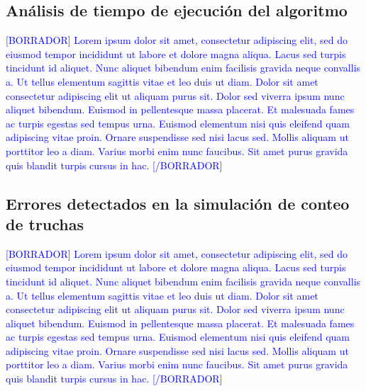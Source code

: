 \subsection{Análisis de tiempo de ejecución del algoritmo}

\textcolor{blue}{[BORRADOR] Lorem ipsum dolor sit amet, consectetur adipiscing elit, sed do eiusmod tempor incididunt ut labore et dolore magna aliqua. Lacus sed turpis tincidunt id aliquet. Nunc aliquet bibendum enim facilisis gravida neque convallis a. Ut tellus elementum sagittis vitae et leo duis ut diam. Dolor sit amet consectetur adipiscing elit ut aliquam purus sit. Dolor sed viverra ipsum nunc aliquet bibendum. Euismod in pellentesque massa placerat. Et malesuada fames ac turpis egestas sed tempus urna. Euismod elementum nisi quis eleifend quam adipiscing vitae proin. Ornare suspendisse sed nisi lacus sed. Mollis aliquam ut porttitor leo a diam. Varius morbi enim nunc faucibus. Sit amet purus gravida quis blandit turpis cursus in hac. [/BORRADOR]} 

\subsection{Errores detectados en la simulación de conteo de truchas}

\textcolor{blue}{[BORRADOR] Lorem ipsum dolor sit amet, consectetur adipiscing elit, sed do eiusmod tempor incididunt ut labore et dolore magna aliqua. Lacus sed turpis tincidunt id aliquet. Nunc aliquet bibendum enim facilisis gravida neque convallis a. Ut tellus elementum sagittis vitae et leo duis ut diam. Dolor sit amet consectetur adipiscing elit ut aliquam purus sit. Dolor sed viverra ipsum nunc aliquet bibendum. Euismod in pellentesque massa placerat. Et malesuada fames ac turpis egestas sed tempus urna. Euismod elementum nisi quis eleifend quam adipiscing vitae proin. Ornare suspendisse sed nisi lacus sed. Mollis aliquam ut porttitor leo a diam. Varius morbi enim nunc faucibus. Sit amet purus gravida quis blandit turpis cursus in hac. [/BORRADOR]} 



